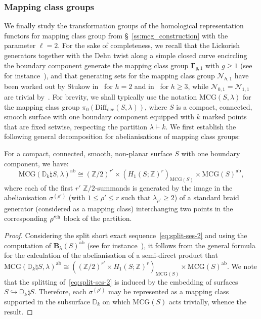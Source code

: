 \documentclass[AHL,Unicode,published]{cedram}
\newcommand{\ab}{\mathrm{ab}}
\newcommand{\MCG}{\mathrm{MCG}}
\newcommand{\rdec}{\mathrm{dec}}
\newcommand{\B}{\ensuremath{\mathbf{B}}}
\newcommand{\MCGo}{\mathbf{\Gamma}}
\newcommand{\MCGno}{\boldsymbol{\mathcal{N}}}
\newcommand{\bD}{\mathbb{D}}
\newcommand{\bZ}{\mathbb{Z}}
\newcommand{\diffdec}{\ensuremath{\mathrm{Diff}_{\rdec}}}
\renewcommand{\geq}{\geqslant}
\renewcommand{\leq}{\leqslant}
\begin{document}
\subsubsection{Mapping class groups}

We finally study the transformation groups of the homological representation functors for mapping class group from \S~\ref{ss:mcg_construction} with the parameter $\ell = 2$. For the sake of completeness, we recall that the Lickorish generators together with the Dehn twist along a simple closed curve encircling the boundary component generate the mapping class group $\MCGo_{g,1}$ with $g\geq 1$ (see for instance~\cite[\S~4.4]{farbmargalit}), and that generating sets for the mapping class group $\MCGno_{h,1}$ have been worked out by Stukow in~\cite[Th.~A.7]{Stukow_Dehn} for $h=2$ and in~\cite[Th.~5.2]{Stukow_Generating} for $h\geq 3$, while $\MCGno_{0,1}=\MCGno_{1,1}$ are trivial by~\cite{Epstein}. For brevity, we shall typically use the notation $\MCG(S,\lambda)$ for the mapping class group $\pi_{0}(\diffdec(S,\lambda))$, where $S$ is a compact, connected, smooth surface with one boundary component equipped with $k$ marked points that are fixed setwise, respecting the partition $\lambda\vdash k$. We first establish the following general decomposition for abelianisations of mapping class groups:

\begin{prop}\label{prop:transformation_group_MCG}
For a compact, connected, smooth, non-planar surface $S$ with one boundary component, we have:
\begin{equation}\label{eq:computation_abel_MCG}
\MCG(\bD_{k}\natural S,\lambda)^{\ab}\cong (\bZ/2)^{r'} \times (H_{1}(S;\bZ)^{r})_{\MCG(S)}\times \MCG(S)^{\ab},
\end{equation}
where each of the first $r'$ $\bZ/2$-summands is generated by the image in the abelianisation $\sigma^{(\rho')}$ (with $1\leq \rho'\leq r$ such that $\lambda_{\rho'}\geq 2$) of a standard braid generator (considered as a mapping class) interchanging two points in the corresponding $\rho'^{\rm th}$ block of the partition.
\end{prop}

\begin{proof}
Considering the split short exact sequence~\eqref{eq:split-ses-2} and using the computation of $\B_{\lambda}(S)^{\ab}$ (see for instance~\cite[Prop.~6.47]{DPS}), it follows from the general formula for the calculation of the abelianisation of a semi-direct product that $\MCG(\bD_{k}\natural S,\lambda)^{\ab}\cong ((\bZ/2)^{r'} \times H_{1}(S;\bZ)^{r})_{\MCG(S)}\times \MCG(S)^{\ab}$. We note that the splitting of~\eqref{eq:split-ses-2} is induced by the embedding of surfaces $S \hookrightarrow\bD_{k}\natural S$. Therefore, each $\sigma^{(\rho')}$ may be represented as a mapping class supported in the subsurface $\bD_{k}$ on which $\MCG(S)$ acts trivially, whence the result.
\end{proof}
\end{document}

